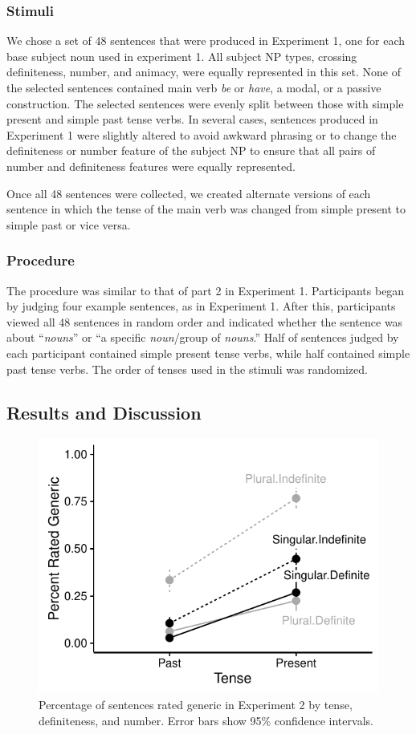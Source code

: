 \documentclass[10pt,letterpaper]{article}
\begin{document}
\subsubsection{Stimuli}

We chose a set of 48 sentences that were produced in Experiment 1, one for each base subject noun used in experiment 1. All subject NP types, crossing definiteness, number, and animacy, were equally represented in this set. None of the selected sentences contained main verb \textit{be} or \textit{have}, a modal, or a passive construction. The selected sentences were evenly split between those with simple present and simple past tense verbs. In several cases, sentences produced in Experiment 1 were slightly altered to avoid awkward phrasing or to change the definiteness or number feature of the subject NP to ensure that all pairs of number and definiteness features were equally represented.

Once all 48 sentences were collected, we created alternate versions of each sentence in which the tense of the main verb was changed from simple present to simple past or vice versa.

\subsubsection{Procedure}

The procedure was similar to that of part 2 in Experiment 1. Participants began by judging four example sentences, as in Experiment 1. After this, participants viewed all 48 sentences in random order and indicated whether the sentence was about ``\textit{nouns}'' or ``a specific \textit{noun}/group of \textit{nouns}.'' Half of sentences judged by each participant contained simple present tense verbs, while half contained simple past tense verbs. The order of tenses used in the stimuli was randomized.

\subsection{Results and Discussion}

\begin{figure}[t]
\centering
\includegraphics[width=.8\linewidth]{figures/tense.pdf}
\caption{\label{fig:tense} Percentage of sentences rated generic in Experiment 2 by tense, definiteness, and number. Error bars show 95\% confidence intervals.}
\end{figure}
\end{document}
